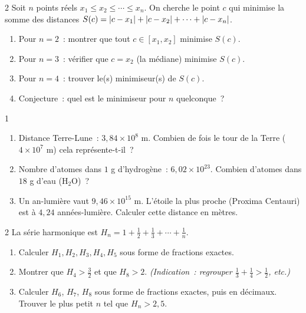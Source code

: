 \begin{probleme}{2}
Soit $n$ points r\'eels $x_1 \leq x_2 \leq \cdots \leq x_n$.
On cherche le point $c$ qui minimise la somme des distances
$S(c) = \left|c-x_1\right| + \left|c-x_2\right| + \cdots + \left|c-x_n\right|$.
\begin{enumerate}
  \item Pour $n=2$~: montrer que tout $c \in [x_1, x_2]$ minimise $S(c)$.
  \item Pour $n=3$~: v\'erifier que $c = x_2$ (la m\'ediane) minimise $S(c)$.
  \item Pour $n=4$~: trouver le(s) minimiseur(s) de $S(c)$.
  \item Conjecture~: quel est le minimiseur pour $n$ quelconque~?
\end{enumerate}
\end{probleme}

\begin{probleme}{1}
\begin{enumerate}
  \item Distance Terre-Lune~: $3{,}84\times10^8$ m.
        Combien de fois le tour de la Terre ($4\times10^7$ m) cela repr\'esente-t-il~?
  \item Nombre d'atomes dans $1$ g d'hydrog\`ene~: $6{,}02\times10^{23}$.
        Combien d'atomes dans $18$ g d'eau ($\text{H}_2\text{O}$)~?
  \item Un an-lumi\`ere vaut $9{,}46\times10^{15}$ m.
        L'\'etoile la plus proche (Proxima Centauri) est \`a $4{,}24$
        ann\'ees-lumi\`ere. Calculer cette distance en m\`etres.
\end{enumerate}
\end{probleme}

\begin{probleme}{2}
La s\'erie harmonique est $H_n = 1 + \frac{1}{2} + \frac{1}{3} + \cdots + \frac{1}{n}$.
\begin{enumerate}
  \item Calculer $H_1, H_2, H_3, H_4, H_5$ sous forme de fractions exactes.
  \item Montrer que $H_4 > \frac{3}{2}$ et que $H_8 > 2$.
        \emph{(Indication~: regrouper $\frac{1}{3}+\frac{1}{4} > \frac{1}{2}$, etc.)}
  \item Calculer $H_6$, $H_7$, $H_8$ sous forme de fractions exactes,
        puis en d\'ecimaux.
        Trouver le plus petit $n$ tel que $H_n > 2{,}5$.
\end{enumerate}
\end{probleme}

